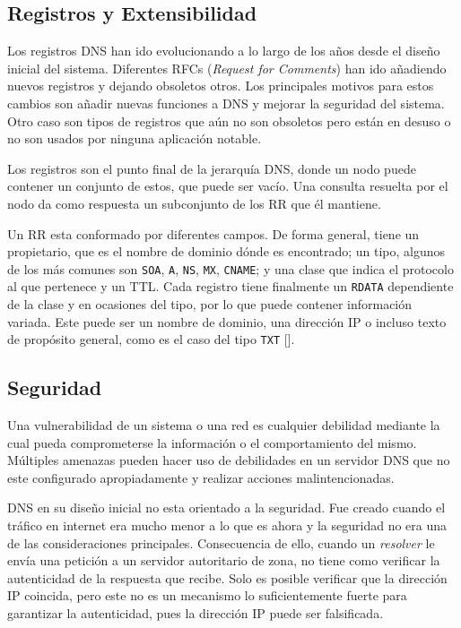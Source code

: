 \subsection{Registros y Extensibilidad}

Los registros DNS han ido evolucionando a lo largo de los años desde el diseño inicial del sistema. Diferentes RFCs (\textit{Request for Comments}) han ido añadiendo nuevos registros y dejando obsoletos otros. Los principales motivos para estos cambios son añadir nuevas funciones a DNS y mejorar la seguridad del sistema. Otro caso son tipos de registros que aún no son obsoletos pero están en desuso o no son usados por ninguna aplicación notable.

Los registros son el punto final de la jerarquía DNS, donde un nodo puede contener un conjunto de estos, que puede ser vacío. Una consulta resuelta por el nodo da como respuesta un subconjunto de los RR que él mantiene.

Un RR esta conformado por diferentes campos. De forma general, tiene un propietario, que es el nombre de dominio dónde es encontrado; un tipo, algunos de los más comunes son \verb|SOA|, \verb|A|, \verb|NS|, \verb|MX|, \verb|CNAME|; y una clase que indica el protocolo al que pertenece y un TTL. Cada registro tiene finalmente un \verb|RDATA| dependiente de la clase y en ocasiones del tipo, por lo que puede contener información variada. Este puede ser un nombre de dominio, una dirección IP o incluso texto de propósito general, como es el caso del tipo \verb|TXT| [\cite{rfc_1464}].

\subsection{Seguridad}

Una vulnerabilidad de un sistema o una red es cualquier debilidad mediante la cual pueda comprometerse la información o el comportamiento del mismo. Múltiples amenazas pueden hacer uso de debilidades en un servidor DNS que no este configurado apropiadamente y realizar acciones malintencionadas.

DNS en su diseño inicial no esta orientado a la seguridad. Fue creado cuando el tráfico en internet era mucho menor a lo que es ahora y la seguridad no era una de las consideraciones principales. Consecuencia de ello, cuando un \textit{resolver} le envía una petición a un servidor autoritario de zona, no tiene como verificar la autenticidad de la respuesta que recibe. Solo es posible verificar que la dirección IP coincida, pero este no es un mecanismo lo suficientemente fuerte para garantizar la autenticidad, pues la dirección IP puede ser falsificada.


